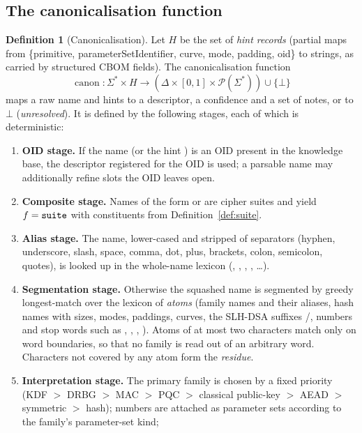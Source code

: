\documentclass[11pt,a4paper]{article}
\newcommand{\codem}[1]{\texttt{\detokenize{#1}}}
\newcommand{\canon}{\operatorname{canon}}
\theoremstyle{definition}
\newtheorem{definition}{Definition}[section]
\theoremstyle{plain}
\begin{document}
\subsection{The canonicalisation function}
\begin{definition}[Canonicalisation]\label{def:canon}
Let $H$ be the set of \emph{hint records} (partial maps from \{primitive, parameterSetIdentifier,
curve, mode, padding, oid\} to strings, as carried by structured CBOM fields). The
canonicalisation function
$$\canon : \Sigma^{*} \times H \to (\Delta \times [0,1] \times \mathcal{P}(\Sigma^{*})) \cup \{\bot\}$$
maps a raw name and hints to a descriptor, a confidence and a set of notes, or to $\bot$
(\emph{unresolved}). It is defined by the following stages, each of which is deterministic:
\begin{enumerate}[nosep]
\item \textbf{OID stage.} If the name (or the hint ) is an OID present in the knowledge
      base, the descriptor registered for the OID is used; a parsable name may additionally
      refine slots the OID leaves open.
\item \textbf{Composite stage.} Names of the form  or  are cipher
      suites and yield $f = \codem{suite}$ with constituents from Definition~\ref{def:suite}.
\item \textbf{Alias stage.} The name, lower-cased and stripped of separators
      (hyphen, underscore, slash, space, comma, dot, plus, brackets, colon, semicolon, quotes), is looked up in the whole-name lexicon
      (, , , , \ldots).
\item \textbf{Segmentation stage.} Otherwise the squashed name is segmented by greedy
      longest-match over the lexicon of \emph{atoms} (family names and their aliases, hash names
      with sizes, modes, paddings, curves, the SLH-DSA suffixes /, numbers and
      stop words such as , , , ). Atoms of at
      most two characters match only on word boundaries, so that no family is read out of an
      arbitrary word. Characters not covered by any atom form the \emph{residue}.
\item \textbf{Interpretation stage.} The primary family is chosen by a fixed priority
      (KDF $>$ DRBG $>$ MAC $>$ PQC $>$ classical public-key $>$ AEAD $>$ symmetric $>$ hash);
      numbers are attached as parameter sets according to the family's parameter-set kind;

\end{enumerate}
\end{definition}
\end{document}
